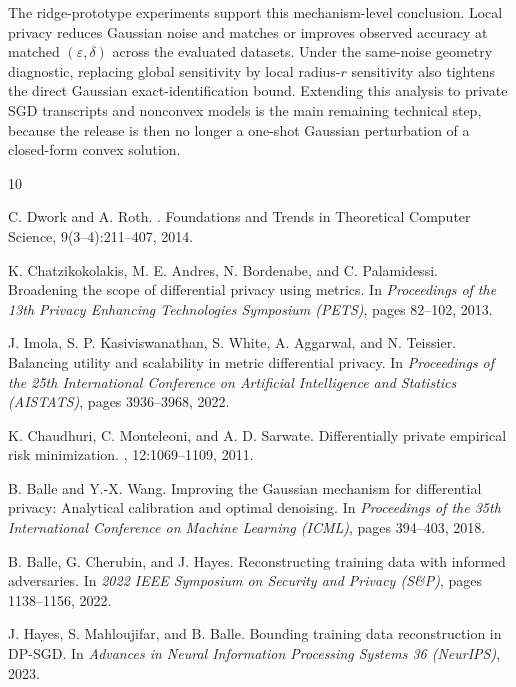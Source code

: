 \documentclass[conference,compsoc]{IEEEtran}
\begin{document}
The ridge-prototype experiments support this mechanism-level conclusion. Local privacy reduces Gaussian noise and matches or improves observed accuracy at matched $(\varepsilon,\delta)$ across the evaluated datasets. Under the same-noise geometry diagnostic, replacing global sensitivity by local radius-$r$ sensitivity also tightens the direct Gaussian exact-identification bound. Extending this analysis to private SGD transcripts and nonconvex models is the main remaining technical step, because the release is then no longer a one-shot Gaussian perturbation of a closed-form convex solution.

\begin{thebibliography}{10}

C. Dwork and A. Roth.
.
\newblock Foundations and Trends in Theoretical Computer Science, 9(3--4):211--407, 2014.

K. Chatzikokolakis, M. E. Andres, N. Bordenabe, and C. Palamidessi.
\newblock Broadening the scope of differential privacy using metrics.
\newblock In {\em Proceedings of the 13th Privacy Enhancing Technologies Symposium (PETS)}, pages 82--102, 2013.

J. Imola, S. P. Kasiviswanathan, S. White, A. Aggarwal, and N. Teissier.
\newblock Balancing utility and scalability in metric differential privacy.
\newblock In {\em Proceedings of the 25th International Conference on Artificial Intelligence and Statistics (AISTATS)}, pages 3936--3968, 2022.

K. Chaudhuri, C. Monteleoni, and A. D. Sarwate.
\newblock Differentially private empirical risk minimization.
, 12:1069--1109, 2011.

B. Balle and Y.-X. Wang.
\newblock Improving the Gaussian mechanism for differential privacy: Analytical calibration and optimal denoising.
\newblock In {\em Proceedings of the 35th International Conference on Machine Learning (ICML)}, pages 394--403, 2018.

B. Balle, G. Cherubin, and J. Hayes.
\newblock Reconstructing training data with informed adversaries.
\newblock In {\em 2022 IEEE Symposium on Security and Privacy (S\&P)}, pages 1138--1156, 2022.

J. Hayes, S. Mahloujifar, and B. Balle.
\newblock Bounding training data reconstruction in {DP-SGD}.
\newblock In {\em Advances in Neural Information Processing Systems 36 (NeurIPS)}, 2023.


\end{thebibliography}
\end{document}
